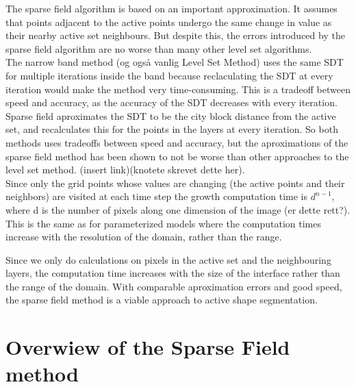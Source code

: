 The sparse field algorithm is based on an important approximation. It assumes that points adjacent to the active points undergo the same change in value as their nearby active set neighbours. But despite this, the errors introduced by the sparse field algorithm are no worse than many other level set algorithms.\\ 

The narrow band method (og også vanlig Level Set Method) uses the same SDT for multiple iterations inside the band because reclaculating the SDT at every iteration would make the method very time-consuming. This is a tradeoff between speed and accuracy, as the accuracy of the SDT decreases with every iteration. Sparse field aproximates the SDT to be the city block distance from the active set, and recalculates this for the points in the layers at every iteration. So both methods uses tradeoffs between speed and accuracy, but the aproximations of the sparse field method has been shown to not be worse than other approaches to the level set method. (insert link)(knotete skrevet dette her).\\


Since only the grid points whose values are changing (the active points and their neighbors) are visited at each time step the growth computation time is \(d^{n-1}\), where d is the number of pixels along one dimension of the image (er dette rett?). This is the same as for parameterized models where the computation times increase with the resolution of the domain, rather than the range. 

Since we only do calculations on pixels in the active set and the neighbouring layers, the computation time increases with the size of the interface rather than the range of the domain. With comparable aproximation errors and good speed, the sparse field method is a viable approach to active shape segmentation.




\section{Overwiew of the Sparse Field method}

